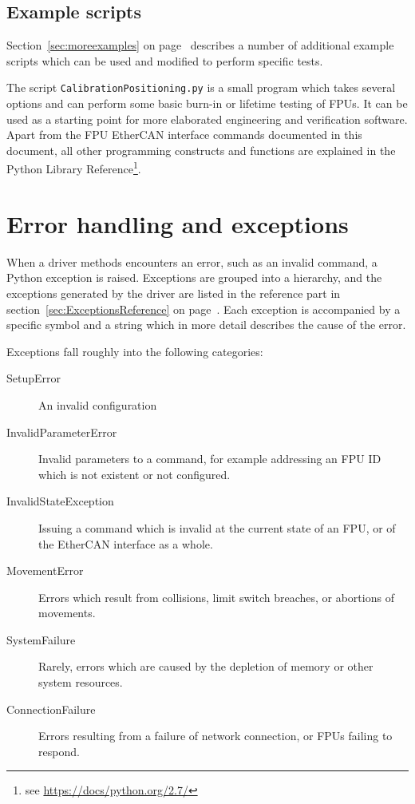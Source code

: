 \documentclass[11pt,a4paper]{scrartcl}
\begin{document}
\subsection{Example scripts}

Section~\ref{sec:moreexamples} on page~\pageref{sec:moreexamples}
describes a number of additional example scripts which can be used and
modified to perform specific tests.

The script \texttt{CalibrationPositioning.py} is a small program which
takes several options and can perform some basic burn-in or lifetime
testing of FPUs. It can be used as a starting point for more
elaborated engineering and verification software. Apart from the FPU
EtherCAN interface commands documented in this document, all other programming
constructs and functions are explained in the Python Library
Reference\footnote{see \url{https://docs/python.org/2.7/}}.


\section{Error handling and exceptions}
\label{sec:errorhandling}
When a driver methods encounters an error, such as an invalid command,
a Python exception is raised. Exceptions are grouped into a hierarchy,
and the exceptions generated by the driver are listed in the reference
part in section~\ref{sec:ExceptionsReference} on
page~\pageref{sec:ExceptionsReference}. Each exception is accompanied
by a specific symbol and a string which in more detail describes the
cause of the error.

Exceptions fall roughly into the following categories:

\begin{description}
  \item[SetupError] An invalid configuration 
  \item[InvalidParameterError] Invalid parameters to a command, for example addressing an FPU
    ID which is not existent or not configured.
  \item[InvalidStateException] Issuing a command which is invalid at the current state of
    an FPU, or of the EtherCAN interface as a whole.
  \item[MovementError] Errors which result from collisions, limit switch breaches,
    or abortions of movements.
  \item[SystemFailure] Rarely, errors which are caused by the depletion of memory
    or other system resources.
  \item[ConnectionFailure] Errors resulting from a failure of network connection, or FPUs failing to respond.
\end{description}
\end{document}
